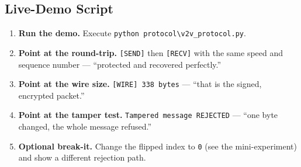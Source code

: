 \documentclass[11pt,a4paper]{report}
\begin{document}
\subsection{Live-Demo Script}
\begin{enumerate}
  \item \textbf{Run the demo.} Execute \texttt{python
        protocol\textbackslash v2v\_protocol.py}.
  \item \textbf{Point at the round-trip.} \texttt{[SEND]} then \texttt{[RECV]}
        with the same speed and sequence number --- ``protected and recovered
        perfectly.''
  \item \textbf{Point at the wire size.} \texttt{[WIRE] 338 bytes} --- ``that is
        the signed, encrypted packet.''
  \item \textbf{Point at the tamper test.} \texttt{Tampered message REJECTED} ---
        ``one byte changed, the whole message refused.''
  \item \textbf{Optional break-it.} Change the flipped index to \texttt{0} (see
        the mini-experiment) and show a different rejection path.
\end{enumerate}
\end{document}
